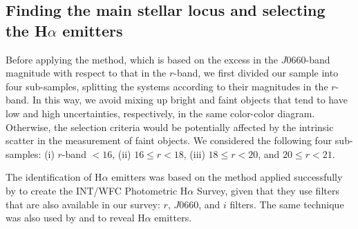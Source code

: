 \documentclass[fleqn,usenatbib]{mnras}
\newcommand{\comment}[1]{\textcolor{red}{#1}}
\newcommand{\luis}[1]{\textcolor{magenta}{#1}}
\begin{document}



  

\subsection{Finding the main stellar locus and selecting the H{$\alpha$ emitters}}
\label{sec:find-halpha}

Before applying the method, which is based on the excess in the $J0660$-band magnitude with respect to that in the $r$-band, we first divided our sample into four sub-samples, splitting the systems according to their magnitudes in the $r$-band. In this way, we avoid mixing up bright and faint objects that tend to have low and high uncertainties, respectively, in the same color-color diagram. Otherwise, the selection criteria would be potentially affected by the intrinsic scatter in the measurement of faint objects. We considered the following four sub-samples: (i) $r$-band $ < 16$, (ii) $16 \leq r < 18$, (iii) $18 \leq r < 20$, and $20 \leq r < 21$.

The identification of H$\alpha$ emitters was based on the method applied successfully by \citep[IPHAS][]{Witham:2008} to create the INT/WFC Photometric H$\alpha$ Survey, given that they use filters that are also available in our survey: $r$, $J$0660, and $i$ filters. The same technique was also used by \citet{Scaringi:2013} and \citet{Wevers:2017} to reveal H{$\alpha$} emitters.

\end{document}
